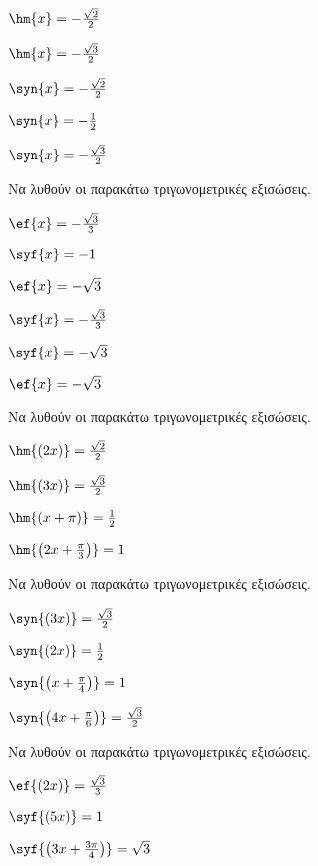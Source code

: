 \begin{multicols}{2}
\begin{multicols}{2}
\begin{rlist}
\item $ \hm{x}=-\frac{\sqrt{2}}{2} $
\item $ \hm{x}=-\frac{\sqrt{3}}{2} $
\item $ \syn{x}=-\frac{\sqrt{2}}{2} $
\item $ \syn{x}=-\frac{1}{2} $
\item $ \syn{x}=-\frac{\sqrt{3}}{2} $
\end{rlist}
\end{multicols}
\Askhsh 
Να λυθούν οι παρακάτω τριγωνομετρικές εξισώσεις.
\begin{multicols}{2}
\begin{rlist}
\item $ \ef{x}=-\frac{\sqrt{3}}{3} $
\item $ \syf{x}=-1 $
\item $ \ef{x}=-\sqrt{3} $
\item $ \syf{x}=-\frac{\sqrt{3}}{3} $
\item $ \syf{x}=-\sqrt{3} $
\item $ \ef{x}=-\sqrt{3} $
\end{rlist}
\end{multicols}
\Askhsh 
Να λυθούν οι παρακάτω τριγωνομετρικές εξισώσεις.
\begin{rlist}
\begin{multicols}{2}
\item $ \hm{(2x)}=\frac{\sqrt{2}}{2} $
\item $ \hm{(3x)}=\frac{\sqrt{3}}{2} $
\item $ \hm{(x+\pi)}=\frac{1}{2} $
\item $ \hm{\left(2x+\frac{\pi}{3}\right)}=1 $
\end{multicols}
\end{rlist}
\Askhsh 
Να λυθούν οι παρακάτω τριγωνομετρικές εξισώσεις.
\begin{rlist}
\item $ \syn{(3x)}=\frac{\sqrt{3}}{2} $
\item $ \syn{(2x)}=\frac{1}{2} $
\item $ \syn{\left( x+\frac{\pi}{4}\right) }=1 $
\item $ \syn{\left(4x+\frac{\pi}{6}\right)}=\frac{\sqrt{3}}{2} $
\end{rlist}
\Askhsh 
Να λυθούν οι παρακάτω τριγωνομετρικές εξισώσεις.
\begin{rlist}
\item $ \ef{(2x)}=\frac{\sqrt{3}}{3} $
\item $ \syf{(5x)}=1 $
\item $ \syf{\left( 3x+\frac{3\pi}{4}\right) }=\sqrt{3} $

\end{rlist}
\end{multicols}
